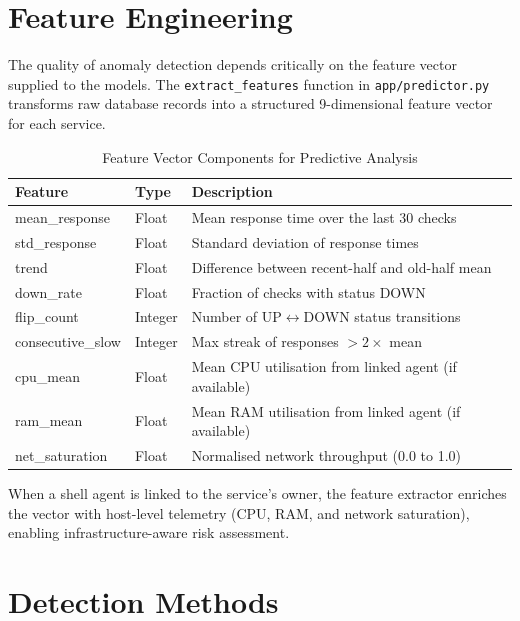 \documentclass[12pt,a4paper,oneside]{report}
\begin{document}
\section{Feature Engineering}
\noindent The quality of anomaly detection depends critically on the feature vector supplied to the models. The \texttt{extract\_features} function in \texttt{app/predictor.py} transforms raw database records into a structured 9-dimensional feature vector for each service.

\begin{table}[H]
\centering
\begin{tabularx}{\textwidth}{|l|l|X|}
\hline
\textbf{Feature} & \textbf{Type} & \textbf{Description} \\
\hline
mean\_response & Float & Mean response time over the last 30 checks \\
\hline
std\_response & Float & Standard deviation of response times \\
\hline
trend & Float & Difference between recent-half and old-half mean \\
\hline
down\_rate & Float & Fraction of checks with status DOWN \\
\hline
flip\_count & Integer & Number of UP$\leftrightarrow$DOWN status transitions \\
\hline
consecutive\_slow & Integer & Max streak of responses $> 2\times$ mean \\
\hline
cpu\_mean & Float & Mean CPU utilisation from linked agent (if available) \\
\hline
ram\_mean & Float & Mean RAM utilisation from linked agent (if available) \\
\hline
net\_saturation & Float & Normalised network throughput (0.0 to 1.0) \\
\hline
\end{tabularx}
\caption{Feature Vector Components for Predictive Analysis}
\label{tab:features}
\end{table}

\noindent When a shell agent is linked to the service's owner, the feature extractor enriches the vector with host-level telemetry (CPU, RAM, and network saturation), enabling infrastructure-aware risk assessment.

\section{Detection Methods}
\end{document}
